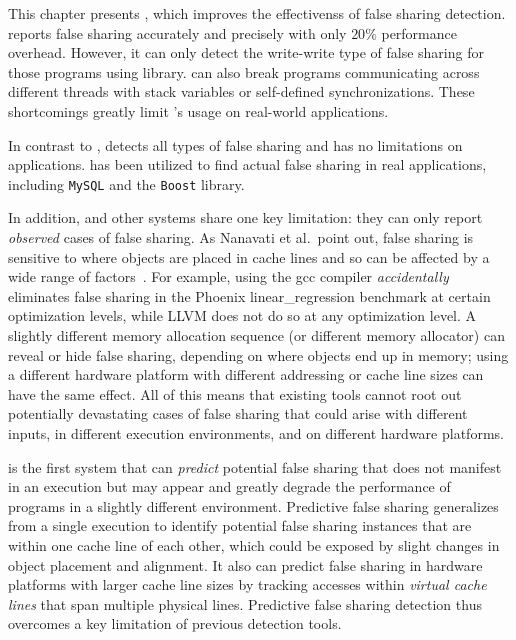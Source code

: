 \label{chapter:preditor}

This chapter presents \Predator{}, which improves the effectivenss of false sharing detection. \SheriffDetect{} reports false sharing accurately and precisely with only $20\%$ performance overhead. However, it can only detect the write-write type of false sharing for those programs using \pthreads{} library. \SheriffDetect{} can also break programs communicating across different threads with stack variables or self-defined synchronizations. These shortcomings greatly limit \SheriffDetect{}'s usage on real-world applications.  

In contrast to \SheriffDetect{}, \Predator{} detects all types of false sharing and has no limitations on applications. \Predator{} has been utilized to find actual false sharing in real applications, including \texttt{MySQL} and the \texttt{Boost} library.

In addition, \SheriffDetect{} and other systems share one key limitation: they can only report \emph{observed} cases of false sharing. As Nanavati et al.\ point out, false sharing is sensitive to where objects are placed in cache lines and so can be affected by a wide range of factors~\cite{OSdetection}. For example, using the gcc compiler \emph{accidentally} eliminates false sharing in the Phoenix linear\_regression benchmark at certain optimization levels, while LLVM does not do so at any optimization level.  A slightly different memory allocation sequence (or different memory allocator) can reveal or hide false sharing, depending on where objects end up in memory; using a different hardware platform with different addressing or cache line sizes can have the same effect. All of this means that existing tools cannot root out potentially devastating cases of false sharing that could arise with different inputs, in different execution environments, and on different hardware platforms.

\Predator{} is the first system that can \emph{predict} potential false sharing that does not manifest in an execution but may appear and greatly degrade the performance of programs in a slightly different
environment. Predictive false sharing generalizes from a single execution to identify potential false sharing instances that are within one cache line of each other, which could be exposed by slight changes in object placement and alignment. It also can predict false sharing in hardware platforms with larger cache line sizes by tracking accesses within \emph{virtual cache lines} that span multiple physical lines. Predictive false sharing detection thus overcomes a key limitation of previous detection tools.

